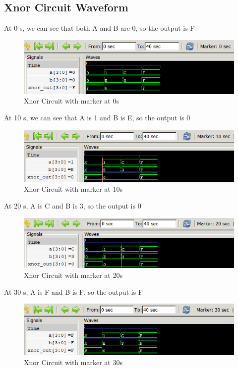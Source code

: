 \documentclass[12pt]{article}
\begin{document}
\newpage


\subsection{Xnor Circuit Waveform}

At 0 s, we can see that both A and B are 0, so the output is F
\begin{figure}[h]
    \centering
    \includegraphics[width = 1.0\textwidth]{figs/Xnor0.png}
    \caption{Xnor Circuit with marker at 0s}
    \label{fig:enter-label}
\end{figure}


At 10 s, we can see that A is 1 and B is E, so the output is 0
\begin{figure}[h]
    \centering
    \includegraphics[width = 1.0\textwidth]{figs/Xnor10.png}
    \caption{Xnor Circuit with marker at 10s}
    \label{fig:enter-label}
\end{figure}

At 20 s, A is C and B is 3, so the output is 0
\begin{figure}[h]
    \centering
    \includegraphics[width = 1.0\textwidth]{figs/Xnor20.png}
    \caption{Xnor Circuit with marker at 20s}
    \label{fig:enter-label}
\end{figure}

\newpage

At 30 s, A is F and B is F, so the output is F
\begin{figure}[h]
    \centering
    \includegraphics[width = 1.0\textwidth]{figs/Xnor30.png}
    \caption{Xnor Circuit with marker at 30s}
    \label{fig:enter-label}
\end{figure}
\end{document}
